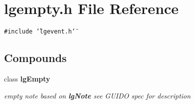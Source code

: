 \section{lgempty.h File Reference}
\label{lgempty_8h}
{\tt \#include \char`\"{}lgevent.h\char`\"{}}\par
\subsection*{Compounds}
\begin{CompactItemize}
\item 
class {\bf lg\-Empty}
\begin{CompactList}\small\item\em empty note based on {\bf lg\-Note} see GUIDO spec for description \item\end{CompactList}\end{CompactItemize}
